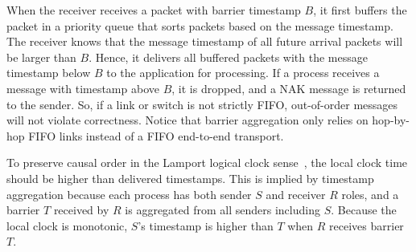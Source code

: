 When the receiver receives a packet with barrier timestamp $B$, it first buffers the packet in a priority queue that sorts packets based on the message timestamp. The receiver knows that the message timestamp of all future arrival packets will be larger than $B$. Hence, it delivers all buffered packets with the message timestamp below $B$ to the application for processing.
If a process receives a message with timestamp above $B$, it is dropped, and a NAK message is returned to the sender. So, if a link or switch is not strictly FIFO, out-of-order messages will not violate correctness.
Notice that barrier aggregation only relies on hop-by-hop FIFO links instead of a FIFO end-to-end transport. 








To preserve causal order in the Lamport logical clock sense~\cite{lamport1978time}, the local clock time should be higher than delivered timestamps.
This is implied by timestamp aggregation because each process has both sender $S$ and receiver $R$ roles, and a barrier $T$ received by $R$ is aggregated from all senders including $S$.
Because the local clock is monotonic, $S$'s timestamp is higher than $T$ when $R$ receives barrier $T$.



